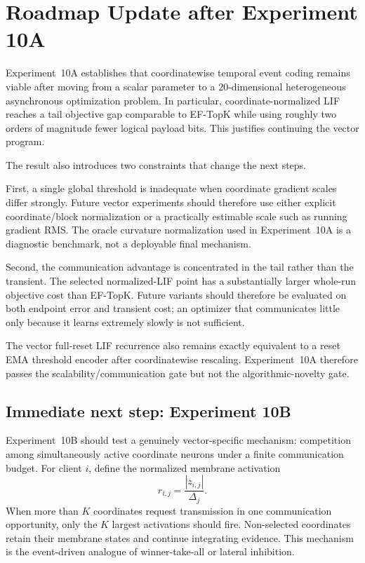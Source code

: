 \section{Roadmap Update after Experiment 10A}

Experiment~10A establishes that coordinatewise temporal event coding remains viable after moving from a scalar parameter to a $20$-dimensional heterogeneous asynchronous optimization problem. In particular, coordinate-normalized LIF reaches a tail objective gap comparable to EF-TopK while using roughly two orders of magnitude fewer logical payload bits. This justifies continuing the vector program.

The result also introduces two constraints that change the next steps.

First, a single global threshold is inadequate when coordinate gradient scales differ strongly. Future vector experiments should therefore use either explicit coordinate/block normalization or a practically estimable scale such as running gradient RMS. The oracle curvature normalization used in Experiment~10A is a diagnostic benchmark, not a deployable final mechanism.

Second, the communication advantage is concentrated in the tail rather than the transient. The selected normalized-LIF point has a substantially larger whole-run objective cost than EF-TopK. Future variants should therefore be evaluated on both endpoint error and transient cost; an optimizer that communicates little only because it learns extremely slowly is not sufficient.

The vector full-reset LIF recurrence also remains exactly equivalent to a reset EMA threshold encoder after coordinatewise rescaling. Experiment~10A therefore passes the scalability/communication gate but not the algorithmic-novelty gate.

\subsection{Immediate next step: Experiment 10B}

Experiment~10B should test a genuinely vector-specific mechanism: competition among simultaneously active coordinate neurons under a finite communication budget. For client $i$, define the normalized membrane activation
\begin{equation}
  r_{i,j}=\frac{|z_{i,j}|}{\Delta_j}.
\end{equation}
When more than $K$ coordinates request transmission in one communication opportunity, only the $K$ largest activations should fire. Non-selected coordinates retain their membrane states and continue integrating evidence. This mechanism is the event-driven analogue of winner-take-all or lateral inhibition.

